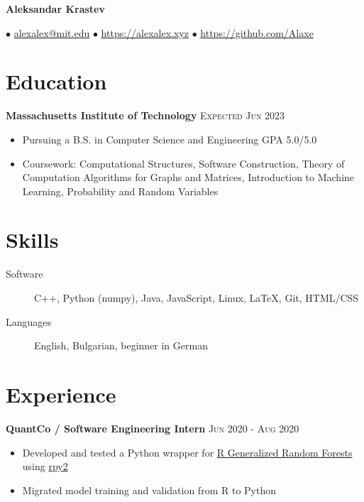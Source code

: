 \documentclass[letterpaper,11pt]{article}
\author{Aleksandar Krastev}
\date{2020-12-21}
\begin{document}
\setlength{\belowdisplayskip}{\parskip}
\setlength{\belowdisplayshortskip}{\belowdisplayskip}
\setlength{\abovedisplayskip}{\parskip}
\setlength{\abovedisplayshortskip}{\abovedisplayskip}



\centerline{{\Huge \bf Aleksandar Krastev}}
$\bullet$ \href{mailto:alexalex@mit.edu}{alexalex@mit.edu} \hfill
$\bullet$ \href{https://alexalex.xyz}{https://alexalex.xyz} \hfill
$\bullet$ \href{https://github.com/Alaxe}{https://github.com/Alaxe} \hfill

\section*{Education}
\textbf{Massachusetts Institute of Technology}
\hfill
\textsc{Expected Jun 2023}

\begin{itemize}
    \item Pursuing a B.S. in Computer Science and Engineering
        \hfill GPA 5.0/5.0
    \item Coursework:
        Computational Structures,
        Software Construction,
        Theory of Computation
        Algorithms for Graphs and Matrices,
        Introduction to Machine Learning,
        Probability and Random Variables
\end{itemize}

\section*{Skills}
\begin{description}
    \item[Software] C++, Python (numpy), Java, JavaScript, Linux, LaTeX, Git,
        HTML/CSS
    \item[Languages] English, Bulgarian, beginner in German
\end{description}

\section*{Experience}
\textbf{QuantCo / Software Engineering Intern}
\hfill
\textsc{Jun 2020 - Aug 2020}
\begin{itemize}
    \item Developed and tested a Python wrapper for
        \href{https://grf-labs.github.io/}{R Generalized Random Forests} using
        \href{https://rpy2.github.io/}{rpy2}
    \item Migrated model training and validation from R to Python
\end{itemize}
\end{document}
